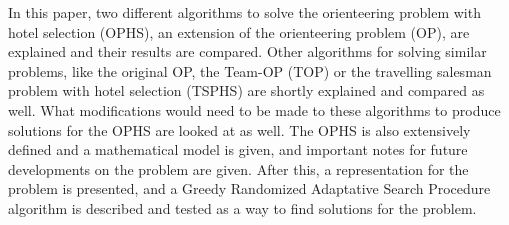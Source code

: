 In this paper, two different algorithms to solve the orienteering problem with hotel selection (OPHS), an extension of the orienteering problem (OP), are explained and their results are compared. Other algorithms for solving similar problems, like the original OP, the Team-OP (TOP) or the travelling salesman problem with hotel selection (TSPHS) are shortly explained and compared as well. What modifications would need to be made to these algorithms to produce solutions for the OPHS are looked at as well. The OPHS is also extensively defined and a mathematical model is given, and important notes for future developments on the problem are given. After this, a representation for the problem is presented, and a Greedy Randomized Adaptative Search Procedure algorithm is described and tested as a way to find solutions for the problem.